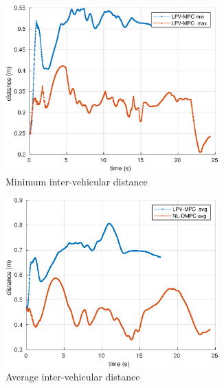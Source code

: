 \documentclass[a4paper,fleqn]{cas-sc}
\begin{document}
\begin{figure}[h]
    \centering
        \begin{subfigure}[a]{0.5\textwidth}
          \centering
          \includegraphics[width=0.9\textwidth]{figs/experiments/d_min.eps}
          \caption{Minimum inter-vehicular distance}
          \label{fig:figPlane}
        \end{subfigure}%
        \begin{subfigure}[a]{.5\textwidth}
          \centering
          \includegraphics[width=0.9\textwidth]{figs/experiments/d_avg.eps}
          \caption{Average inter-vehicular distance}
          \label{fig:figEuclidean}
        \end{subfigure}
        \begin{subfigure}[b]{0.5\textwidth}
          \centering

\end{subfigure}
\end{figure}
\end{document}
